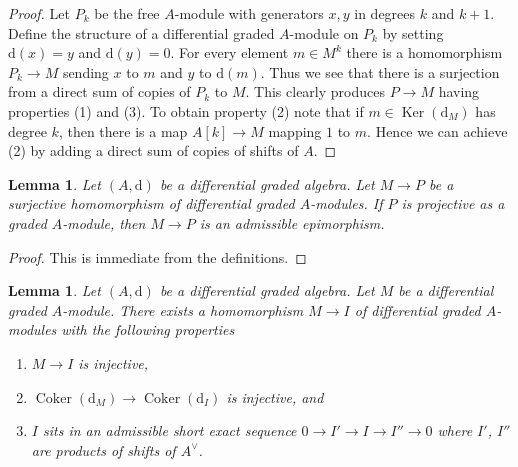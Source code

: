 \documentclass{stacks-project}
\theoremstyle{plain}
\newtheorem{lemma}[subsection]{Lemma}
\theoremstyle{definition}
\theoremstyle{remark}
\numberwithin{equation}{subsection}
\def\Ker{\mathop{\mathrm{Ker}}}
\def\Coker{\mathop{\mathrm{Coker}}}
\begin{document}
\begin{proof}
Let $P_k$ be the free $A$-module with generators $x, y$ in degrees
$k$ and $k + 1$. Define the structure of a differential graded
$A$-module on $P_k$ by setting $\text{d}(x) = y$ and $\text{d}(y) = 0$.
For every element $m \in M^k$ there is a homomorphism
$P_k \to M$ sending $x$ to $m$ and $y$ to $\text{d}(m)$.
Thus we see that there is a surjection from a direct sum
of copies of $P_k$ to $M$. This clearly produces $P \to M$
having properties (1) and (3). To obtain property (2) note
that if $m \in \Ker(\text{d}_M)$ has degree $k$, then there is a map
$A[k] \to M$ mapping $1$ to $m$. Hence we can achieve (2) by adding
a direct sum of copies of shifts of $A$.
\end{proof}

\begin{lemma}
\label{lemma-target-graded-projective}
Let $(A, \text{d})$ be a differential graded algebra.
Let $M \to P$ be a surjective homomorphism of differential graded
$A$-modules. If $P$ is projective as a graded $A$-module, then
$M \to P$ is an admissible epimorphism.
\end{lemma}

\begin{proof}
This is immediate from the definitions.
\end{proof}

\begin{lemma}
\label{lemma-good-sub}
Let $(A, \text{d})$ be a differential graded algebra.
Let $M$ be a differential graded $A$-module. There exists a homomorphism
$M \to I$ of differential graded $A$-modules with the following
properties
\begin{enumerate}
\item $M \to I$ is injective,
\item $\Coker(\text{d}_M) \to \Coker(\text{d}_I)$ is injective,
and
\item $I$ sits in an admissible short exact sequence
$0 \to I' \to I \to I'' \to 0$ where $I'$, $I''$ are products
of shifts of $A^\vee$.
\end{enumerate}
\end{lemma}
\end{document}
